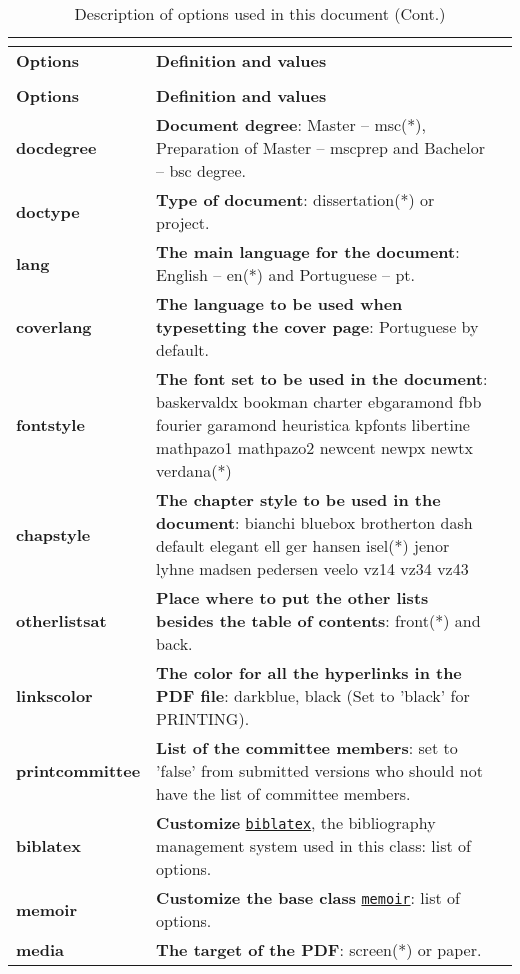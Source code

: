 \begin{xltabular}{\linewidth}{ >{\bfseries}l   X }
\caption{Description of options used in this document}
\label{tab:vardescription}                                  
\addtocounter{table}{-1}                  \\
    \toprule
\textbf{Options} & \textbf{Definition and values}  \\
    \midrule
\endfirsthead
\caption[]{Description of options used in this document (Cont.)} \\
    \toprule
\textbf{Options} & \textbf{Definition and values}      \\
    \midrule
\endhead
\endfoot
    \bottomrule
\endlastfoot
docdegree   &  \textbf{Document degree}: Master -- msc(*), Preparation of Master -- mscprep and Bachelor -- bsc degree. \\ \midrule
doctype & \textbf{Type of document}: dissertation(*) or project. \\ \midrule
lang    &  \textbf{The main language for the document}: English -- en(*) and Portuguese -- pt.  \\  \midrule
coverlang   &  \textbf{The language to be used when typesetting the cover page}: Portuguese by default.  \\  \midrule
fontstyle & \textbf{The font set to be used in the document}: baskervaldx bookman charter ebgaramond fbb fourier garamond heuristica kpfonts libertine mathpazo1 mathpazo2 newcent newpx newtx verdana(*) \\  \midrule
chapstyle   & \textbf{The chapter style to be used in the document}: bianchi bluebox brotherton dash default elegant ell ger hansen isel(*) jenor lyhne madsen pedersen veelo vz14 vz34 vz43  \\  \midrule
otherlistsat &   \textbf{Place where to put the other lists besides the table of contents}: front(*) and back. \\  \midrule
linkscolor & \textbf{The color for all the hyperlinks in the PDF file}: darkblue, black (Set to 'black' for PRINTING). \\ \midrule
printcommittee &  \textbf{List of the committee members}: set to 'false' from submitted versions who should not have the list of committee members.   \\ \midrule
biblatex  & \textbf{Customize} \href{https://ctan.org/pkg/biblatex?lang=en}{\texttt{biblatex}}, the bibliography management system used in this class: list of options.  \\ \midrule
memoir  & \textbf{Customize the base class} \href{https://ctan.math.illinois.edu/macros/latex/contrib/memoir/memman.pdf}{\texttt{memoir}}: list of options.  \\ \midrule
media  & \textbf{The target of the PDF}: screen(*) or paper.\\
\bottomrule
\end{xltabular}
% 
	
